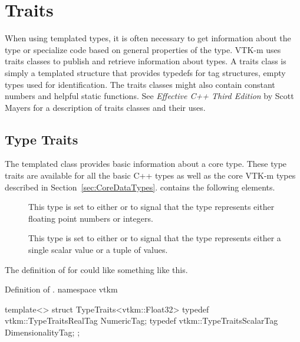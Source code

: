 \section{Traits}
\label{sec:Traits}


When using templated types, it is often necessary to get information about
the type or specialize code based on general properties of the type. VTK-m
uses traits classes to publish and retrieve information about types. A
traits class is simply a templated structure that provides typedefs for
tag structures, empty types used for identification. The traits
classes might also contain constant numbers and helpful static
functions. See {\it Effective C++ Third Edition} by Scott Mayers for a
description of traits classes and their uses.

\subsection{Type Traits}


The  templated class provides basic information
about a core type. These type traits are available for all the basic C++
types as well as the core VTK-m types described in
Section~\ref{sec:CoreDataTypes}.  contains the following
elements.


\begin{description}
\item[]  
  This type is set to either  or
   to signal that the type represents either
  floating point numbers or integers.
\item[] 
   This type is set to either
   or  to signal that
  the type represents either a single scalar value or a tuple of values.
\end{description}

The definition of  for  could like something
like this.
\begin{vtkmexample}{Definition of \protect {}.}
namespace vtkm {

template<>
struct TypeTraits<vtkm::Float32>
{
  typedef vtkm::TypeTraitsRealTag NumericTag;
  typedef vtkm::TypeTraitsScalarTag DimensionalityTag;
};

}
\end{vtkmexample}

